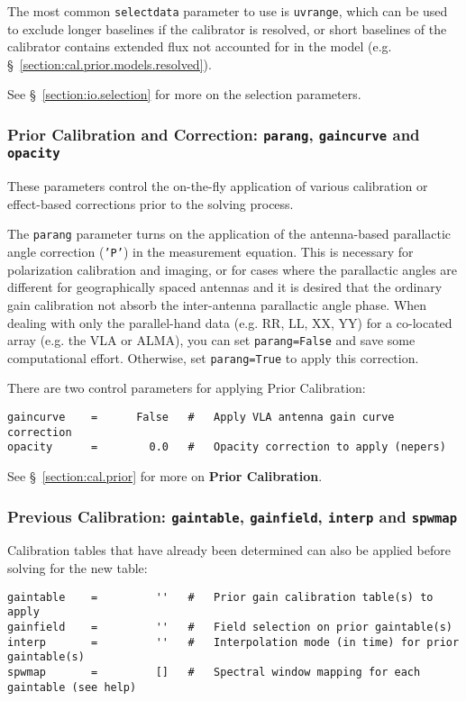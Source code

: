 The most common {\tt selectdata} parameter to use is {\tt uvrange},
which can be used to exclude longer baselines if the calibrator is
resolved, or short baselines of the calibrator contains extended flux
not accounted for in the model 
(e.g. \S~\ref{section:cal.prior.models.resolved}).

See \S~\ref{section:io.selection} for more on the selection parameters.

\subsubsection{Prior Calibration and Correction: {\tt parang}, {\tt gaincurve} and
   {\tt opacity} }
\label{section:cal.solve.pars.prior}

These parameters control the on-the-fly application of various
calibration or effect-based corrections prior to the solving process.

The {\tt parang} parameter turns on the application of the
antenna-based parallactic angle correction ({\tt 'P'}) in the
measurement equation.  This is necessary for polarization calibration
and imaging, or for cases where the parallactic angles are different
for geographically spaced antennas and it is desired that the ordinary
gain calibration not absorb the inter-antenna parallactic angle phase.  
When dealing with only the parallel-hand data (e.g. RR, LL, XX, YY)
for a co-located array (e.g. the VLA or ALMA), you can set {\tt  parang=False} 
and save some computational effort.  Otherwise, set {\tt parang=True} to apply
this correction.

There are two control parameters for applying Prior Calibration:
\small
\begin{verbatim}
gaincurve    =      False   #   Apply VLA antenna gain curve correction
opacity      =        0.0   #   Opacity correction to apply (nepers)
\end{verbatim}
\normalsize

See \S~\ref{section:cal.prior} for more on {\bf Prior Calibration}.

\subsubsection{Previous Calibration: {\tt gaintable},
{\tt gainfield}, {\tt interp} and {\tt spwmap} }
\label{section:cal.solve.pars.previous}

Calibration tables that have already been determined can also be
applied before solving for the new table:
\small
\begin{verbatim}
gaintable    =         ''   #   Prior gain calibration table(s) to apply
gainfield    =         ''   #   Field selection on prior gaintable(s)
interp       =         ''   #   Interpolation mode (in time) for prior gaintable(s)
spwmap       =         []   #   Spectral window mapping for each gaintable (see help)
\end{verbatim}
\normalsize

